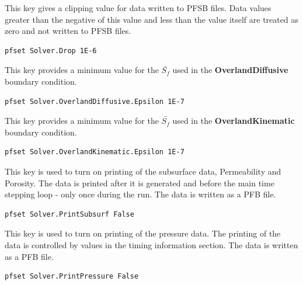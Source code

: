 {
This key gives a clipping value for data written to PFSB
files.  Data values greater than the negative of this
value and less than the value itself are treated as zero
and not written to PFSB files.
}
\begin{display}\begin{verbatim}
pfset Solver.Drop 1E-6
\end{verbatim}\end{display}

{
This key provides a minimum value for the $\bar{S_{f}}$ used in the {\bf OverlandDiffusive} boundary condition.
}
\begin{display}\begin{verbatim}
pfset Solver.OverlandDiffusive.Epsilon 1E-7
\end{verbatim}\end{display}

{
This key provides a minimum value for the $\bar{S_{f}}$ used in the {\bf OverlandKinematic} boundary condition.
}
\begin{display}\begin{verbatim}
pfset Solver.OverlandKinematic.Epsilon 1E-7
\end{verbatim}\end{display}

{
This key is used to turn on printing of the subsurface data,
Permeability and Porosity.  The data is printed after it is
generated and before the main time stepping loop - only once
during the run.  The data is written as a PFB file.
}
\begin{display}\begin{verbatim}
pfset Solver.PrintSubsurf False
\end{verbatim}\end{display}

{
This key is used to turn on printing of the pressure data.
The printing of the data is controlled by values in the
timing information section.  The data is written as a PFB
file.
}
\begin{display}\begin{verbatim}
pfset Solver.PrintPressure False
\end{verbatim}\end{display}

